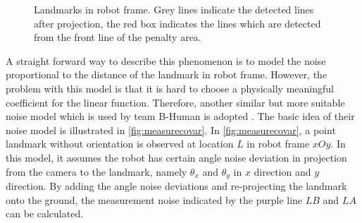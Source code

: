 \begin{figure}[h!]
  \centering
{}
\caption[Landmarks in robot frame]{Landmarks in robot frame. Grey lines indicate the detected lines after projection, the red box indicates the lines which are detected from the front line of the penalty area.}
  \label{fig:landmarkRobotFrame}
\end{figure}

A straight forward way to describe this phenomenon is to model the noise proportional to the distance of the landmark in robot frame. However, the problem with this model is that it is hard to choose a physically meaningful coefficient for the linear function. Therefore, another similar but more suitable noise model which is used by team B-Human is adopted \cite{Bhuman}. The basic idea of their noise model is illustrated in \autoref{fig:measurecovar}. In \autoref{fig:measurecovar}, a point landmark without orientation is observed at location $L$ in robot frame $xOy$. In this model, it assumes the robot has certain angle noise deviation in projection from the camera to the landmark, namely $\theta_{x}$ and $\theta_{y}$ in $x$ direction and $y$ direction. By adding the angle noise deviations and re-projecting the landmark onto the ground, the measurement noise indicated by the purple line $LB$ and $LA$ can be calculated. 

